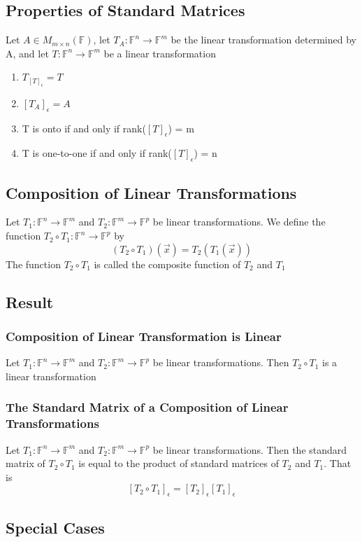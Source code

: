 \documentclass[12pt, letterpaper]{article}
\begin{document}
\subsection{Properties of Standard Matrices}
Let $A\in M_{m\times n}(\mathbb{F})$, let $T_A: \mathbb{F}^n \rightarrow\mathbb{F}^m$ be the linear transformation determined by A, and let $T: \mathbb{F}^n \rightarrow\mathbb{F}^m$ be a linear transformation
\begin{enumerate}
    \item $T_{[T]_\epsilon} = T$
    \item $[T_A]_\epsilon = A$
    \item T is onto if and only if rank($[T]_\epsilon$) = m 
    \item T is one-to-one if and only if rank($[T]_\epsilon$) = n 
\end{enumerate}
\subsection{Composition of Linear Transformations}
Let $T_1: \mathbb{F}^n \rightarrow\mathbb{F}^m$ and $T_2: \mathbb{F}^m \rightarrow\mathbb{F}^p$ be linear transformations. We define the function $T_2\circ T_1: \mathbb{F}^n\rightarrow\mathbb{F}^p$ by 
\[(T_2\circ T_1)(\vec{x}) = T_2(T_1(\vec{x}))\]
The function $T_2\circ T_1$ is called the composite function of $T_2$ and $T_1$
\subsection{Result}
\subsubsection{Composition of Linear Transformation is Linear}
Let $T_1: \mathbb{F}^n \rightarrow\mathbb{F}^m$ and $T_2: \mathbb{F}^m \rightarrow\mathbb{F}^p$ be linear transformations. Then $T_2\circ T_1$ is a linear transformation
\subsubsection{The Standard Matrix of a Composition of Linear Transformations}
Let $T_1: \mathbb{F}^n \rightarrow\mathbb{F}^m$ and $T_2: \mathbb{F}^m \rightarrow\mathbb{F}^p$ be linear transformations. Then the standard matrix of $T_2\circ T_1$ is equal to the 
product of standard matrices of $T_2$ and $T_1$. That is
\[[T_2\circ T_1]_\epsilon = [T_2]_\epsilon[T_1]_\epsilon\]
\subsection{Special Cases}
\end{document}
